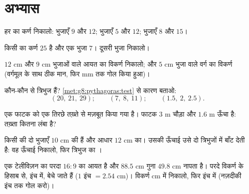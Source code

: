 \section{अभ्यास}

\begin{exercise}[$\star$]\label{exo:g8:pythagoras:1}
हर  का कर्ण निकालो:  भुजाएँ $9$ और $12$; \quad
{} भुजाएँ $5$ और $12$; \quad {} भुजाएँ $8$ और $15$।
\end{exercise}

\begin{exercise}[$\star$]\label{exo:g8:pythagoras:2}
किसी  का कर्ण $25$ है और एक  भुजा $7$। दूसरी
 भुजा निकालो।
\end{exercise}

\begin{exercise}[$\star$]\label{exo:g8:pythagoras:3}
$12$ cm और $9$ cm भुजाओं वाले आयत का विकर्ण निकालो; और $5$ cm भुजा
वाले वर्ग का विकर्ण (वर्गमूल के साथ ठीक मान, फिर mm तक गोल किया
हुआ)।
\end{exercise}

\begin{exercise}[$\star$]\label{exo:g8:pythagoras:4}
कौन-कौन से त्रिभुज  हैं? \cref{met:g8:pythagoras:test} से कारण
बताओ:
\[
(20,\ 21,\ 29); \qquad
(7,\ 8,\ 11); \qquad
(1.5,\ 2,\ 2.5).
\]
\end{exercise}

\begin{exercise}[$\star$]\label{exo:g8:pythagoras:5}
एक फाटक को एक तिरछे तख़्ते से मज़बूत किया गया है। फाटक $3$ m चौड़ा
और $1.6$ m ऊँचा है: तख़्ता कितना लंबा है?
\end{exercise}

\begin{exercise}[$\star$]\label{exo:g8:pythagoras:6}
किसी  की दो भुजाएँ $10$ cm की हैं और आधार $12$ cm
का। उसकी ऊँचाई उसे दो  त्रिभुजों में बाँट देती है: वह ऊँचाई
निकालो, फिर त्रिभुज का ।
\end{exercise}

\begin{exercise}[$\star\star$]\label{exo:g8:pythagoras:7}
एक टेलीविज़न का परदा $16{:}9$ का आयत है और $88.5$ cm गुना $49.8$ cm
नापता है। परदे विकर्ण के हिसाब से, इंच में, बेचे जाते हैं
($1$ इंच $= 2.54$ cm)। विकर्ण cm में निकालो, फिर इंच में (नज़दीकी
इंच तक गोल करो)।
\end{exercise}

